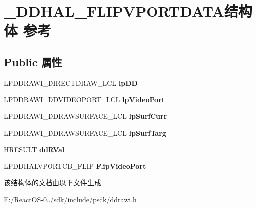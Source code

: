 \hypertarget{struct___d_d_h_a_l___f_l_i_p_v_p_o_r_t_d_a_t_a}{}\section{\+\_\+\+D\+D\+H\+A\+L\+\_\+\+F\+L\+I\+P\+V\+P\+O\+R\+T\+D\+A\+T\+A结构体 参考}
\label{struct___d_d_h_a_l___f_l_i_p_v_p_o_r_t_d_a_t_a}
\subsection*{Public 属性}
\begin{DoxyCompactItemize}
\item 
\mbox{\label{struct___d_d_h_a_l___f_l_i_p_v_p_o_r_t_d_a_t_a_a941649562273a6d15524c9a2957f7fa0}} 
L\+P\+D\+D\+R\+A\+W\+I\+\_\+\+D\+I\+R\+E\+C\+T\+D\+R\+A\+W\+\_\+\+L\+CL {\bfseries lp\+DD}
\item 
\mbox{\label{struct___d_d_h_a_l___f_l_i_p_v_p_o_r_t_d_a_t_a_aef699582e3e89e6562b20326959c5996}} 
\hyperlink{struct___d_d_r_a_w_i___d_d_v_i_d_e_o_p_o_r_t___l_c_l}{L\+P\+D\+D\+R\+A\+W\+I\+\_\+\+D\+D\+V\+I\+D\+E\+O\+P\+O\+R\+T\+\_\+\+L\+CL} {\bfseries lp\+Video\+Port}
\item 
\mbox{\label{struct___d_d_h_a_l___f_l_i_p_v_p_o_r_t_d_a_t_a_a3f6c44fbbd90de674d1621c7b12ad7ef}} 
L\+P\+D\+D\+R\+A\+W\+I\+\_\+\+D\+D\+R\+A\+W\+S\+U\+R\+F\+A\+C\+E\+\_\+\+L\+CL {\bfseries lp\+Surf\+Curr}
\item 
\mbox{\label{struct___d_d_h_a_l___f_l_i_p_v_p_o_r_t_d_a_t_a_a5f572bd0245d46bee0bcc8bfbe742e01}} 
L\+P\+D\+D\+R\+A\+W\+I\+\_\+\+D\+D\+R\+A\+W\+S\+U\+R\+F\+A\+C\+E\+\_\+\+L\+CL {\bfseries lp\+Surf\+Targ}
\item 
\mbox{\label{struct___d_d_h_a_l___f_l_i_p_v_p_o_r_t_d_a_t_a_abb67504b06f14ec198532fe19d618f2b}} 
H\+R\+E\+S\+U\+LT {\bfseries dd\+R\+Val}
\item 
\mbox{\label{struct___d_d_h_a_l___f_l_i_p_v_p_o_r_t_d_a_t_a_a348d356e3a181398264015f2fe7649e4}} 
L\+P\+D\+D\+H\+A\+L\+V\+P\+O\+R\+T\+C\+B\+\_\+\+F\+L\+IP {\bfseries Flip\+Video\+Port}
\end{DoxyCompactItemize}


该结构体的文档由以下文件生成\+:\begin{DoxyCompactItemize}
\item 
E\+:/\+React\+O\+S-\/0../sdk/include/psdk/ddrawi.\+h\end{DoxyCompactItemize}
